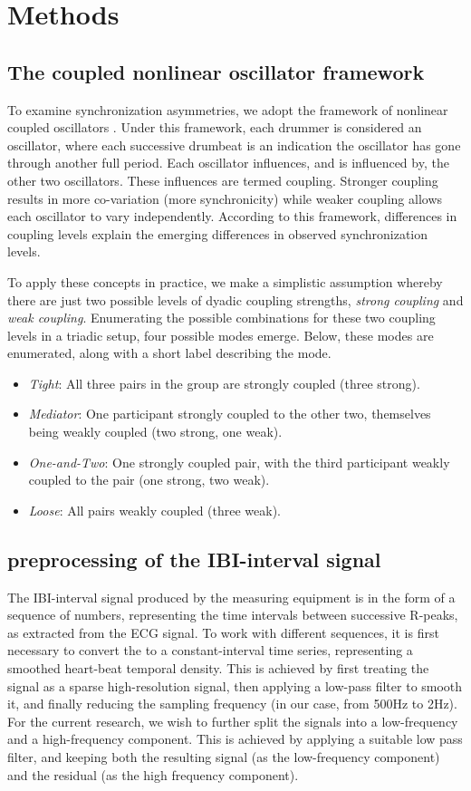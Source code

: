 \documentclass[a4paper, 11pt]{report}      %
\begin{document}
\section{Methods}

\subsection{The coupled nonlinear oscillator framework}
To examine synchronization asymmetries, we adopt the framework of nonlinear coupled oscillators \citep{abp2017symmetry}. Under this framework, each drummer is considered an oscillator, where each successive drumbeat is an indication the oscillator has gone through another full period. Each oscillator influences, and is influenced by, the other two oscillators. These influences are termed coupling. Stronger coupling results in more co-variation (more synchronicity) while weaker coupling allows each oscillator to vary independently. According to this framework, differences in coupling levels explain the emerging differences in observed synchronization levels. 

To apply these concepts in practice, we make a simplistic assumption whereby there are just two possible levels of dyadic coupling strengths, \emph{strong coupling} and \emph{weak coupling}. Enumerating the possible combinations for these two coupling levels in a triadic setup, four possible modes emerge. Below, these modes are enumerated, along with a short label describing the mode.
\begin{itemize}
    \item \emph{Tight}: All three pairs in the group are strongly coupled (three strong).
    \item \emph{Mediator}: One participant strongly coupled to the other two, themselves being weakly coupled (two strong, one weak).
    \item \emph{One-and-Two}: One strongly coupled pair, with the third participant weakly coupled to the pair (one strong, two weak).
    \item \emph{Loose}: All pairs weakly coupled (three weak).
\end{itemize}

\subsection{preprocessing of the IBI-interval signal}
The IBI-interval signal produced by the measuring equipment is in the form of a sequence of numbers, representing the time intervals between successive R-peaks, as extracted from the ECG signal. To work with different sequences, it is first necessary to convert the to a constant-interval time series, representing a smoothed heart-beat temporal density. This is achieved by first treating the signal as a sparse high-resolution signal, then applying a low-pass filter to smooth it, and finally reducing the sampling frequency (in our case, from 500Hz to 2Hz). For the current research, we wish to further split the signals into a low-frequency and a high-frequency component. This is achieved by applying a suitable low pass filter, and keeping both the resulting signal (as the low-frequency component) and the residual (as the high frequency component).
\end{document}

